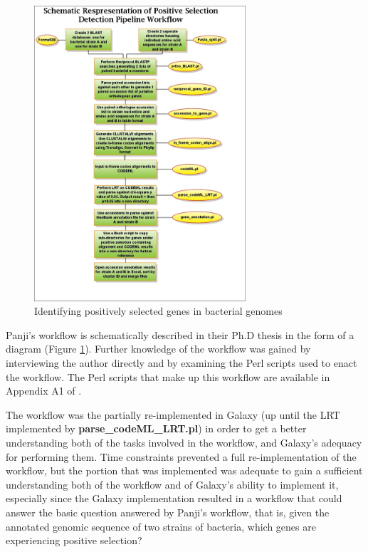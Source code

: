 \documentclass[a4paper,10pt]{scrreprt} \usepackage[utf8]{inputenc}
\begin{document}
\begin{figure}[!htb]
\centering
\includegraphics[width=0.7\textwidth]{sumir/Thesis_figures/Methods_section/pipeline_steps_mark_7}
\caption{Identifying positively selected genes in bacterial genomes}
\label{fig:sumir_pipeline}
\end{figure}

Panji's workflow is schematically described in their Ph.D thesis in the form of a diagram (Figure \ref{fig:sumir_pipeline}). Further knowledge of the workflow was gained by interviewing the author directly and by examining the Perl scripts used to enact the workflow.  The Perl scripts that make up this workflow are available in Appendix A1 of \cite{panji_identification_2009}.

The workflow was the partially re-implemented in Galaxy (up until the LRT implemented by \textbf{parse\_codeML\_LRT.pl}) in order to get a better understanding both of the tasks involved in the workflow, and Galaxy's adequacy for performing them. Time constraints prevented a full re-implementation of the workflow, but the portion that was implemented was adequate to gain a sufficient understanding both of the workflow and of Galaxy's ability to implement it, especially since the Galaxy implementation resulted in a workflow that could answer the basic question answered by Panji's workflow, that is, given the annotated genomic sequence of two strains of bacteria, which genes are experiencing positive selection?
\end{document}
